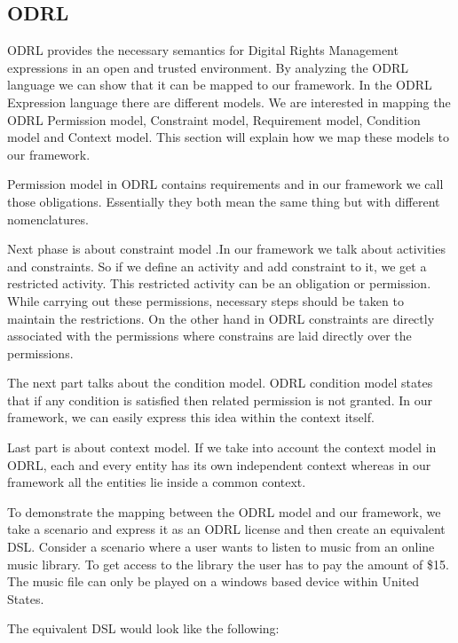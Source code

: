 \subsection{ODRL}\label{sec:model-odrl}
ODRL provides the necessary semantics for Digital Rights Management expressions in an open and trusted environment. By analyzing the ODRL language we can show that it can be mapped to our framework. In the ODRL Expression language there are different models. We are interested in mapping the ODRL Permission model, Constraint model, Requirement model, Condition model and Context model. This section will explain how we map these models to our framework.

Permission model in ODRL contains requirements and in our framework we call those obligations. Essentially they both mean the same thing but with different nomenclatures.

Next phase is about constraint model .In our framework we talk about activities and constraints. So if we define an activity and add constraint to it, we get a restricted activity. This restricted activity can be an obligation or permission. While carrying out these permissions, necessary steps should be taken to maintain the restrictions. On the other hand in ODRL constraints are directly associated with the permissions where constrains are laid directly over the permissions.

The next part talks about the condition model. ODRL condition model states that if any condition is satisfied then related permission is not granted. In our framework, we can easily express this idea within the context itself.

Last part is about context model. If we take into account the context model in ODRL, each and every entity has its own independent context whereas in our framework all the entities lie inside a common context.

To demonstrate the mapping between the ODRL model and our framework, we take a scenario and express it as an ODRL license and then create an equivalent DSL. Consider a scenario where a user wants to listen to music from an online music library. To get access to the library the user has to pay the amount of \$15. The music file can only be played on a windows based device within United States.



The equivalent DSL would look like the following:

